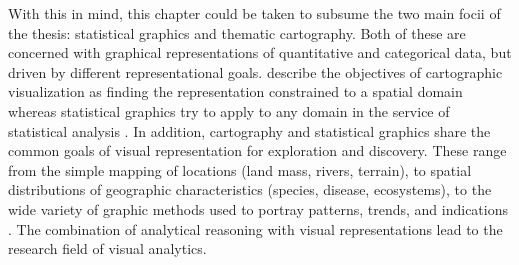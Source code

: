 With this in mind, this chapter could be taken to subsume the two main focii of the thesis: statistical graphics and thematic cartography. Both of these are concerned with graphical representations of quantitative and categorical data, but driven by different representational goals. \citeauthor{Friendly.2001} describe the objectives of cartographic visualization as finding the representation constrained to a spatial domain whereas statistical graphics try to apply to any domain in the service of statistical analysis . In addition, cartography and statistical graphics share the common goals of visual representation for exploration and discovery. These range from the simple mapping of locations (land mass, rivers, terrain), to spatial distributions of geographic characteristics (species, disease, ecosystems), to the wide variety of graphic methods used to portray patterns, trends, and indications . The combination of analytical reasoning with visual representations lead to the research field of visual analytics.

